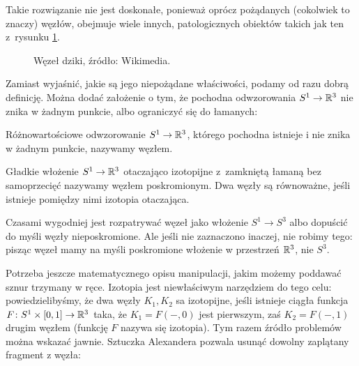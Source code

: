 Takie rozwiązanie nie jest doskonałe, ponieważ oprócz pożądanych (cokolwiek to znaczy) węzłów, obejmuje wiele innych, patologicznych obiektów takich jak ten z~rysunku \ref{fig_wild_knot}.

\begin{figure}[H]
    \centering

    \caption[caption-for-lof-1]{Węzeł dziki, źródło: Wikimedia{\footnotemark}.}
    \label{fig_wild_knot}
\end{figure}

Zamiast wyjaśnić, jakie są jego niepożądane właściwości, podamy od razu dobrą definicję.
Można dodać założenie o tym, że pochodna odwzorowania $S^1 \to \mathbb R^3$ nie znika w żadnym punkcie, albo ograniczyć się do łamanych:

\begin{definition}[węzeł]
    Różnowartościowe odwzorowanie $S^1 \to \mathbb R^3$, którego pochodna istnieje i nie znika w żadnym punkcie, nazywamy węzłem.
\end{definition}

\begin{definition}[węzeł?]
%
\label{def:knot}%
    Gładkie włożenie $S^1 \to \mathbb R^3$ otaczająco izotopijne z~zamkniętą łamaną bez samoprzecięć nazywamy węzłem poskromionym.
    Dwa węzły są równoważne, jeśli istnieje pomiędzy nimi izotopia otaczająca.
\end{definition}

Czasami wygodniej jest rozpatrywać węzeł jako włożenie $S^1 \to S^3$ albo dopuścić do myśli węzły nieposkromione.
Ale jeśli nie zaznaczono inaczej, nie robimy tego: pisząc węzeł mamy na myśli poskromione włożenie w przestrzeń $\mathbb R^3$, nie $S^3$.

Potrzeba jeszcze matematycznego opisu manipulacji, jakim możemy poddawać sznur trzymany w ręce.
Izotopia jest niewłaściwym narzędziem do tego celu: powiedzielibyśmy, że dwa węzły $K_1, K_2$ sa izotopijne, jeśli istnieje ciągła funkcja $F \colon S^1 \times [0, 1] \to \mathbb R^3$ taka, że $K_1 = F(-, 0)$ jest pierwszym, zaś $K_2 = F(-,1)$ drugim węzłem (funkcję $F$ nazywa się izotopia).
Tym razem źródło problemów można wskazać jawnie.
Sztuczka Alexandera pozwala usunąć dowolny zaplątany fragment z węzła:

